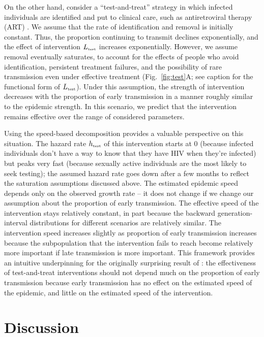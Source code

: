 \documentclass[12pt]{article}
\newcommand{\tsub}[2]{#1_{{\textrm{\tiny #2}}}}
\newcommand{\figref}[1]{Fig.~\ref{fig:#1}}
\begin{document}
On the other hand, consider a ``test-and-treat'' strategy in which infected individuals are identified and put to clinical care, such as antiretroviral therapy (ART) \citep{garnett2009treating, nah2017test}.
We assume that the rate of identification and removal is initially constant.
Thus, the proportion continuing to transmit declines exponentially, and the effect of intervention $\tsub{L}{test}$ increases exponentially.
However, we assume removal eventually saturates, to account for the effects of people who avoid identification, persistent treatment failures, and the possibility of rare transmission even under effective treatment
(\figref{test}A; see caption for the functional form of $\tsub{L}{test}$).
Under this assumption, the strength of intervention decreases with the proportion of early transmission in a manner roughly similar to the epidemic strength.
In this scenario, we predict that the intervention remains effective over the range of considered parameters.

Using the speed-based decomposition provides a valuable perspective on this situation.
The hazard rate $\tsub{h}{test}$ of this intervention starts at 0 (because infected individuals don't have a way to know that they have HIV when they're infected) but peaks very fast (because sexually active individuals are the most likely to seek testing); 
the assumed hazard rate goes down after a few months to reflect the saturation assumptions discussed above. 
The estimated epidemic speed depends only on the observed growth rate -- it does not change if we change our assumption about the proportion of early transmission.
The effective speed of the intervention stays relatively constant, in part because the backward generation-interval distributions for different  scenarios are relatively similar.
The intervention speed increases slightly as proportion of early transmission increases because the subpopulation that the intervention fails to reach become relatively more important if late transmission is more important.
This framework provides an intuitive underpinning for the originally surprising result of \cite{eaton2014proportion}: the effectiveness of test-and-treat interventions should not depend much on the proportion of early transmission because early transmission has no effect on the estimated speed of the epidemic, and little on the estimated speed of the intervention.

\section{Discussion}
\end{document}
